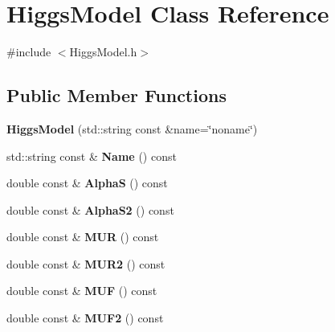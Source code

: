 \hypertarget{classHiggsModel}{\section{Higgs\-Model Class Reference}
\label{classHiggsModel}
}


{\ttfamily \#include $<$Higgs\-Model.\-h$>$}

\subsection*{Public Member Functions}
\begin{DoxyCompactItemize}
\item 
\hypertarget{classHiggsModel_aa6f39f73df22008fa639fd64653cc8e2}{{\bfseries Higgs\-Model} (std\-::string const \&name=\char`\"{}noname\char`\"{})}\label{classHiggsModel_aa6f39f73df22008fa639fd64653cc8e2}

\item 
\hypertarget{classHiggsModel_a29a94aee623c9ce8d874b8b4fba17835}{std\-::string const \& {\bfseries Name} () const }\label{classHiggsModel_a29a94aee623c9ce8d874b8b4fba17835}

\item 
\hypertarget{classHiggsModel_a343a0ea0a7a22e78c3504dc64d4d6184}{double const \& {\bfseries Alpha\-S} () const }\label{classHiggsModel_a343a0ea0a7a22e78c3504dc64d4d6184}

\item 
\hypertarget{classHiggsModel_a41c108f3545d39dbb23835d781a163ee}{double const \& {\bfseries Alpha\-S2} () const }\label{classHiggsModel_a41c108f3545d39dbb23835d781a163ee}

\item 
\hypertarget{classHiggsModel_aca6071e5666fa030cacb0a11efaa1f22}{double const \& {\bfseries M\-U\-R} () const }\label{classHiggsModel_aca6071e5666fa030cacb0a11efaa1f22}

\item 
\hypertarget{classHiggsModel_a2f76729834fcbab6bb0b8c8595c05983}{double const \& {\bfseries M\-U\-R2} () const }\label{classHiggsModel_a2f76729834fcbab6bb0b8c8595c05983}

\item 
\hypertarget{classHiggsModel_a24085f73b5e2858e86db20470f8e5c9f}{double const \& {\bfseries M\-U\-F} () const }\label{classHiggsModel_a24085f73b5e2858e86db20470f8e5c9f}

\item 
\hypertarget{classHiggsModel_af636a81480654395084ead903d5ee00b}{double const \& {\bfseries M\-U\-F2} () const }\label{classHiggsModel_af636a81480654395084ead903d5ee00b}


\end{DoxyCompactItemize}
